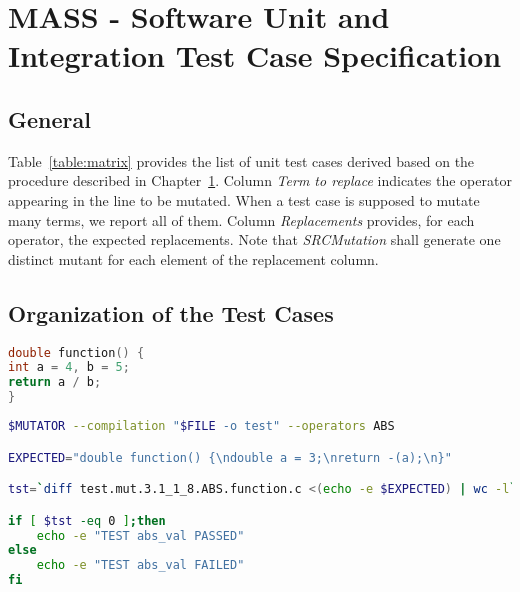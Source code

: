 
\chapter{MASS - Software Unit and Integration Test Case Specification}
\label{chap:spec}

\section{General}




Table~\ref{table:matrix} provides the list of unit test cases derived based on the procedure described in Chapter~\ref{chap:spec}. 
Column \emph{Term to replace} indicates the operator appearing in the line to be mutated. When a test case is supposed to mutate many terms, we report all of them.
Column \emph{Replacements} provides, for each operator, the expected replacements.
Note that \emph{SRCMutation} shall generate one distinct mutant for each element of the replacement column.









\clearpage

\section{Organization of the Test Cases}

\begin{lstlisting}[language=C, label=test_source, caption=C function example.]
double function() {
int a = 4, b = 5;
return a / b;
}
\end{lstlisting}

\begin{lstlisting}[language=bash, label=test_example, caption=ABS test case example.]
$MUTATOR --compilation "$FILE -o test" --operators ABS

EXPECTED="double function() {\ndouble a = 3;\nreturn -(a);\n}"

tst=`diff test.mut.3.1_1_8.ABS.function.c <(echo -e $EXPECTED) | wc -l`

if [ $tst -eq 0 ];then
    echo -e "TEST abs_val PASSED"
else
    echo -e "TEST abs_val FAILED"
fi
\end{lstlisting}


